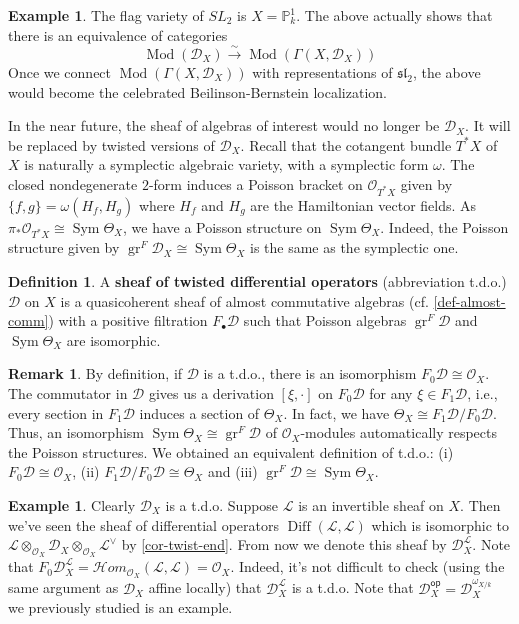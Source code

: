 \documentclass[11pt, a4paper]{article}
\theoremstyle{definition}
\newtheorem{remark}[theorem]{Remark}
\newtheorem{example}[theorem]{Example}
\newtheorem{definition}[theorem]{Definition}
\newcommand{\gr}{\operatorname{gr}}
\newcommand{\w}[0]{\omega}
\newcommand{\Sym}[0]{\operatorname{Sym}}
\newcommand{\op}[0]{\mathsf{op}}
\newcommand{\Mod}{\operatorname{Mod}}
\newcommand{\Diff}{\operatorname{Diff}}
\begin{document}
    \begin{example}
        The flag variety of $SL_2$ is $X=\mathbb P^1_k$. The above actually shows that there is an equivalence of categories
        \[\Mod(\mathcal D_X)\xrightarrow{\sim}\Mod(\Gamma(X,\mathcal D_X))\]
        Once we connect $\Mod(\Gamma(X,\mathcal D_X))$ with representations of $\mathfrak{sl}_2$, the above would become the celebrated Beilinson-Bernstein localization.
    \end{example}
    In the near future, the sheaf of algebras of interest would no longer be $\mathcal D_X$. It will be replaced by twisted versions of $\mathcal D_X$. Recall that the cotangent bundle $T^*X$ of $X$ is naturally a symplectic algebraic variety, with a symplectic form $\w$. The closed nondegenerate $2$-form induces a Poisson bracket on $\mathcal O_{T^*X}$ given by $\{f,g\}=\w(H_f,H_g)$ where $H_f$ and $H_g$ are the Hamiltonian vector fields. As $\pi_*\mathcal O_{T^*X}\cong\Sym\Theta_X$, we have a Poisson structure on $\Sym\Theta_X$. Indeed, the Poisson structure given by $\gr^F\mathcal D_X\cong\Sym\Theta_X$ is the same as the symplectic one.
    \begin{definition}
        A \textbf{sheaf of twisted differential operators} (abbreviation t.d.o.) $\mathcal D$ on $X$ is a quasicoherent sheaf of almost commutative algebras (cf. \cref{def-almost-comm}) with a positive filtration $F_\bullet\mathcal D$ such that Poisson algebras $\gr^F\mathcal D$ and $\Sym\Theta_X$ are isomorphic.
    \end{definition}
    \begin{remark}
        By definition, if $\mathcal D$ is a t.d.o., there is an isomorphism $F_0\mathcal D\cong\mathcal O_X$. The commutator in $\mathcal D$ gives us a derivation $[\xi, \cdot]$ on $F_0\mathcal D$ for any $\xi\in F_1\mathcal D$, i.e., every section in $F_1\mathcal D$ induces a section of $\Theta_X$. In fact, we have $\Theta_X\cong F_1\mathcal D/F_0\mathcal D$. Thus, an isomorphism $\Sym\Theta_X\cong \gr^F\mathcal D$ of $\mathcal O_X$-modules automatically respects the Poisson structures. We obtained an equivalent definition of t.d.o.: (i) $F_0\mathcal D\cong\mathcal O_X$, (ii) $F_1\mathcal D/F_0\mathcal D\cong\Theta_X$ and (iii) $\gr^F\mathcal D\cong\Sym\Theta_X$.
    \end{remark}
    \begin{example}
        Clearly $\mathcal D_X$ is a t.d.o. Suppose $\mathcal L$ is an invertible sheaf on $X$. Then we've seen the sheaf of differential operators $\Diff(\mathcal L,\mathcal L)$ which is isomorphic to $\mathcal L\otimes_{\mathcal O_X}\mathcal D_X\otimes_{\mathcal O_X}\mathcal L^\vee$ by \cref{cor-twist-end}. From now we denote this sheaf by $\mathcal D_X^{\mathcal L}$. Note that $F_0\mathcal D_X^{\mathcal L}=\mathcal Hom_{\mathcal O_X}(\mathcal L,\mathcal L)=\mathcal O_X$. Indeed, it's not difficult to check (using the same argument as $\mathcal D_X$ affine locally) that $\mathcal D_X^{\mathcal L}$ is a t.d.o. Note that $\mathcal D_X^\op=\mathcal D_X^{\w_{X/k}}$ we previously studied is an example.
    \end{example}
\end{document}
